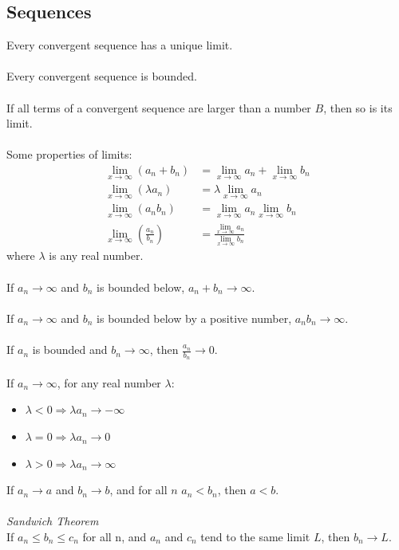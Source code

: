 \documentclass{article}
\begin{document}
\subsection{Sequences}
Every convergent sequence has a unique limit.
\\\\
Every convergent sequence is bounded.
\\\\
If all terms of a convergent sequence are larger than a number $ B $, then so is its limit.
\\\\
Some properties of limits:
\begin{align}
\lim_{x \to \infty}(a_{n} + b_{n}) & = \lim_{x \to \infty} a_{n} + \lim_{x \to \infty} b_{n} \\
\lim_{x \to \infty}(\lambda a_{n}) & = \lambda\lim_{x \to \infty} a_{n} \\
\lim_{x \to \infty}(a_{n}b_{n}) & = \lim_{x \to \infty} a_{n}\lim_{x \to \infty} b_{n} \\
\lim_{x \to \infty}(\frac{a_{n}}{b_{n}}) & = \frac{\lim_{x \to \infty} a_{n}}{\lim_{x \to \infty} b_{n}}
\end{align}
where $ \lambda $ is any real number.
\\\\
If $ a_{n} \to \infty $ and $ b_{n} $ is bounded below, $ a_{n} + b_{n} \to \infty $.
\\\\
If $ a_{n} \to \infty $ and $ b_{n} $ is bounded below by a positive number, $ a_{n}b_{n} \to \infty $.
\\\\
If $ a_{n} $ is bounded and $ b_{n} \to \infty $, then $ \frac{a_{n}}{b_{n}} \to 0 $.
\\\\
If $ a_{n} \to \infty $, for any real number $ \lambda $:
\begin{itemize}
\item $ \lambda < 0 \Rightarrow \lambda a_{n} \to -\infty $
\item $ \lambda = 0 \Rightarrow \lambda a_{n} \to 0 $
\item $ \lambda > 0 \Rightarrow \lambda a_{n} \to \infty $
\end{itemize}
If $ a_{n} \to a $ and $ b_{n} \to b $, and for all $ n $ $ a_{n} < b_{n} $, then $ a < b $.
\\\\
\textit{Sandwich Theorem}
\\
If $ a_{n} \leq b_{n} \leq c_{n} $ for all n, and $ a_{n} $ and $ c_{n} $ tend to the same limit $ L $, then $ b_{n} \to L $.
\end{document}
